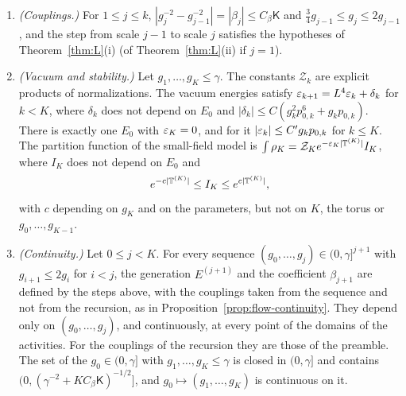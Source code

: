 \begin{maintheorem}
\begin{enumerate}[label=(\roman*)]
\item \emph{(Couplings.)} For $1\le j\le k$, $|g_j^{-2}-g_{j-1}^{-2}|=|\beta_j|\le C_\beta\mathsf K$ and $\frac34g_{j-1}\le g_j\le2g_{j-1}$, and the step from scale $j-1$ to scale $j$ satisfies the hypotheses of Theorem~\ref{thm:L}(i) (of Theorem~\ref{thm:L}(ii) if $j=1$).
\item \emph{(Vacuum and stability.)} Let $g_1,\dots,g_K\le\gamma$. The constants $\mathcal Z_k$ are explicit products of normalizations. The vacuum energies satisfy $\varepsilon_{k+1}=L^4\varepsilon_k+\delta_k$ for $k<K$, where $\delta_k$ does not depend on $E_0$ and $|\delta_k|\le C(g_k^2p_{0,k}^6+g_kp_{0,k})$. There is exactly one $E_0$ with $\varepsilon_K=0$, and for it $|\varepsilon_k|\le C'g_kp_{0,k}$ for $k\le K$. The partition function of the small-field model is $\int\rho_K=\mathcal Z_Ke^{-\varepsilon_K|\mathbb T^{(K)}|}I_K$, where $I_K$ does not depend on $E_0$ and
\[
e^{-c|\mathbb T^{(K)}|}\le I_K\le e^{c|\mathbb T^{(K)}|},
\]
with $c$ depending on $g_K$ and on the parameters, but not on $K$, the torus or $g_0,\dots,g_{K-1}$.
\item \emph{(Continuity.)} Let $0\le j<K$. For every sequence $(g_0,\dots,g_j)\in(0,\gamma]^{j+1}$ with $g_{i+1}\le2g_i$ for $i<j$, the generation $E^{(j+1)}$ and the coefficient $\beta_{j+1}$ are defined by the steps above, with the couplings taken from the sequence and not from the recursion, as in Proposition~\ref{prop:flow-continuity}. They depend only on $(g_0,\dots,g_j)$, and continuously, at every point of the domains of the activities. For the couplings of the recursion they are those of the preamble. The set of the $g_0\in(0,\gamma]$ with $g_1,\dots,g_K\le\gamma$ is closed in $(0,\gamma]$ and contains $(0,(\gamma^{-2}+KC_\beta\mathsf K)^{-1/2}]$, and $g_0\mapsto(g_1,\dots,g_K)$ is continuous on it.
\end{enumerate}
\end{maintheorem}

